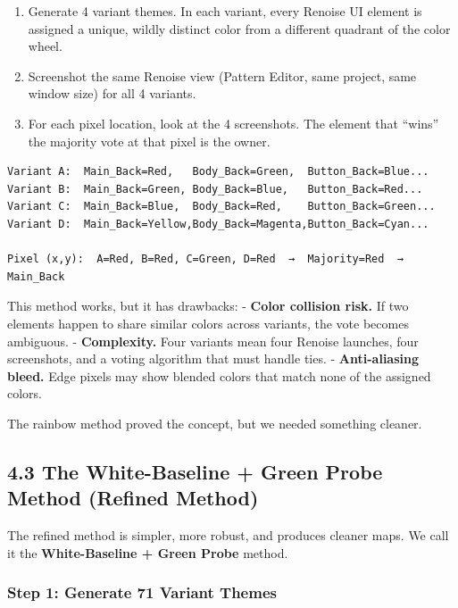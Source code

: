 \documentclass[
  11pt,
  oneside]{report}
\providecommand{\tightlist}{%
  \setlength{\itemsep}{0pt}\setlength{\parskip}{0pt}}
\begin{document}
\begin{enumerate}
\def\labelenumi{\arabic{enumi}.}
\tightlist
\item
  Generate 4 variant themes. In each variant, every Renoise UI element
  is assigned a unique, wildly distinct color from a different quadrant
  of the color wheel.
\item
  Screenshot the same Renoise view (Pattern Editor, same project, same
  window size) for all 4 variants.
\item
  For each pixel location, look at the 4 screenshots. The element that
  ``wins'' the majority vote at that pixel is the owner.
\end{enumerate}

\begin{verbatim}
Variant A:  Main_Back=Red,   Body_Back=Green,  Button_Back=Blue...
Variant B:  Main_Back=Green, Body_Back=Blue,   Button_Back=Red...
Variant C:  Main_Back=Blue,  Body_Back=Red,    Button_Back=Green...
Variant D:  Main_Back=Yellow,Body_Back=Magenta,Button_Back=Cyan...

Pixel (x,y):  A=Red, B=Red, C=Green, D=Red  →  Majority=Red  →  Main_Back
\end{verbatim}

This method works, but it has drawbacks: - \textbf{Color collision
risk.} If two elements happen to share similar colors across variants,
the vote becomes ambiguous. - \textbf{Complexity.} Four variants mean
four Renoise launches, four screenshots, and a voting algorithm that
must handle ties. - \textbf{Anti-aliasing bleed.} Edge pixels may show
blended colors that match none of the assigned colors.

The rainbow method proved the concept, but we needed something cleaner.

\subsection{4.3 The White-Baseline + Green Probe Method (Refined
Method)}\label{the-white-baseline-green-probe-method-refined-method}

The refined method is simpler, more robust, and produces cleaner maps.
We call it the \textbf{White-Baseline + Green Probe} method.

\subsubsection{Step 1: Generate 71 Variant
Themes}\label{step-1-generate-71-variant-themes}
\end{document}
